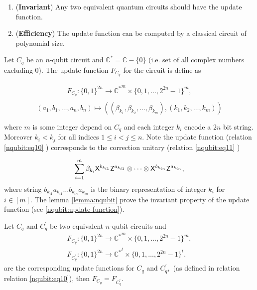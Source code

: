 \begin{enumerate}
\item ({\bf Invariant}) Any two equivalent quantum circuits should have the update function.
\item ({\bf Efficiency}) The update function can be computed by a classical circuit of polynomial size.
\end{enumerate}

Let $C_q$ be an $n$-qubit circuit and $\mathbb{C}^*= \mathbb{C}-\{0\}$ (i.e. set of all complex numbers excluding 0). The update function $F_{C_q}$ for the circuit is define as 

\begin{equation}
\label{nqubit:eq10}
\begin{aligned}
F_{C_q}: \{0,1\}^{2n}\longrightarrow {\mathbb{C}^*}^m\times \{0,1,\ldots,2^{2n}-1\}^m, \\
\end{aligned}
\end{equation}
$$(a_1,b_1,\ldots, a_n,b_n) \mapsto ((\beta_{k_1}, \beta_{k_2},\ldots, \beta_{k_m}),(k_1,k_2,\ldots, k_m))$$

where $m$ is some integer depend on $C_q$ and each integer $k_i$ encode a $2n$ bit string. Moreover  $k_i< k_j$ for all indices $1 \leq i<j \leq n.$ Note  the update function (relation \ref{nqubit:eq10} ) corresponds to the correction unitary (relation  \ref{nqubit:eq11} )

\begin{equation}
\label{nqubit:eq11}
\begin{aligned}
\sum_{i=1}^m \beta_{k_i} {\sf X}^{b_{k_{i1}}} {\sf Z}^{a_{k_{i1}}} \otimes \cdots  \otimes {\sf X}^{b_{k_{in}}} {\sf Z}^{a_{k_{in}}},
\end{aligned}
\end{equation}
where string $b_{k_{i1}} a_{k_{i1}}\ldots b_{k_{in}} a_{k_{in}}$ is the binary representation of integer $k_i$ for $i\in[m].$ The lemma \ref{lemma:nqubit} prove the invariant property of the update function (see \ref{nqubit:update-function}).


\begin{lemma}
\label{lemma:nqubit}
Let $C_q$ and $C_q^\prime$ be two equivalent $n$-qubit circuits and 
\begin{equation*}
\begin{aligned}
F_{C_q}: \{0,1\}^{2n}\longrightarrow {\mathbb{C}^*}^m\times \{0,1,\ldots,2^{2n}-1\}^m,  \\
F_{C_q^\prime}: \{0,1\}^{2n}\longrightarrow {\mathbb{C}^*}^{t}\times \{0,1,\ldots,2^{2n}-1\}^{t}. 
\end{aligned}
\end{equation*}
are the corresponding update functions for $C_q$ and $C_q^\prime,$  (as defined in relation relation \ref{nqubit:eq10}), then $F_{C_q}=F_{C_q^\prime}.$
\end{lemma}

